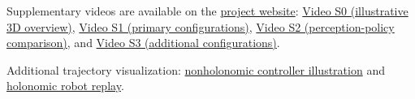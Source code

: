 \newcommand{\CAPProjectURL}{https://cap-vision-source-seeking.open-lotus-0369.chatgpt.site/}
Supplementary videos are available on the
\href{\CAPProjectURL}{project website}:
\href{\CAPProjectURL\#s0-scene}{Video S0 (illustrative 3D overview)},
\href{\CAPProjectURL\#s1-primary}{Video S1 (primary configurations)},
\href{\CAPProjectURL\#s2-policy-comparison}{Video S2 (perception-policy comparison)}, and
\href{\CAPProjectURL\#s3-additional}{Video S3 (additional configurations)}.

Additional trajectory visualization:
\href{\CAPProjectURL\#paper-nonholonomic}{nonholonomic controller illustration} and
\href{\CAPProjectURL\#paper-holonomic}{holonomic robot replay}.
